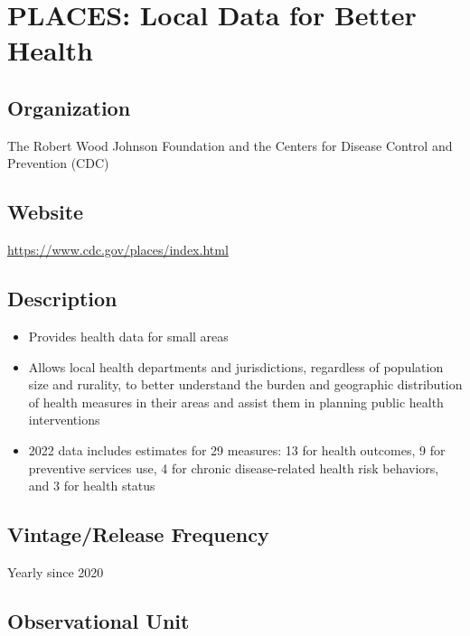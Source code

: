 \documentclass[
]{book}
\providecommand{\tightlist}{%
  \setlength{\itemsep}{0pt}\setlength{\parskip}{0pt}}
\begin{document}
\mainmatter

\hypertarget{places-local-data-for-better-health}{%
\chapter{PLACES: Local Data for Better Health}\label{places-local-data-for-better-health}}

\hypertarget{organization-73}{%
\section{Organization}\label{organization-73}}

The Robert Wood Johnson Foundation and the Centers for Disease Control and Prevention (CDC)

\hypertarget{website-73}{%
\section{Website}\label{website-73}}

\url{https://www.cdc.gov/places/index.html}

\hypertarget{description-73}{%
\section{Description}\label{description-73}}

\begin{itemize}
\tightlist
\item
  Provides health data for small areas
\item
  Allows local health departments and jurisdictions, regardless of population size and rurality, to better understand the burden and geographic distribution of health measures in their areas and assist them in planning public health interventions
\item
  2022 data includes estimates for 29 measures: 13 for health outcomes, 9 for preventive services use, 4 for chronic disease-related health risk behaviors, and 3 for health status
\end{itemize}

\hypertarget{vintagerelease-frequency-73}{%
\section{Vintage/Release Frequency}\label{vintagerelease-frequency-73}}

Yearly since 2020

\hypertarget{observational-unit-73}{%
\section{Observational Unit}\label{observational-unit-73}}
\end{document}
